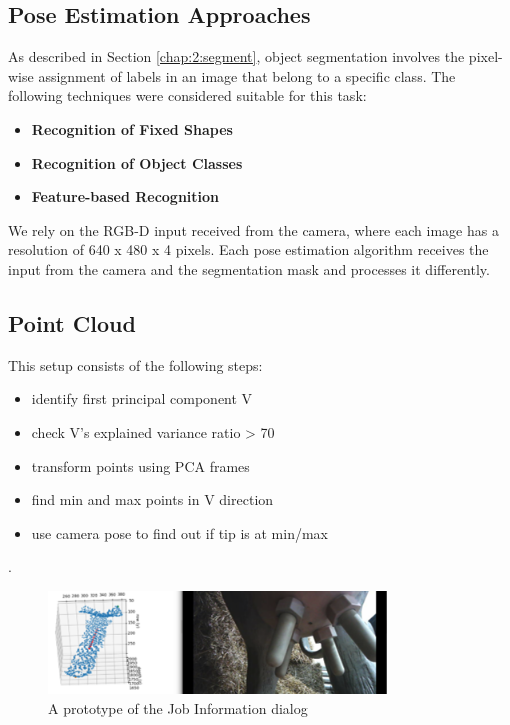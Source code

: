 
\subsection{Pose Estimation Approaches}
As described in Section \ref{chap:2:segment}, object segmentation involves the pixel-wise assignment of labels in an image that belong to a specific class. The following techniques were considered suitable for this task:
\begin{itemize}
    \item \textbf{Recognition of Fixed Shapes} 
    \item \textbf{Recognition of Object Classes} 
    \item \textbf{Feature-based Recognition} 
\end{itemize}
We rely on the RGB-D input received from the camera, where each image has a resolution of 640 x 480 x 4 pixels. Each pose estimation algorithm receives the input from the camera and the segmentation mask and processes it differently. 

    \subsection{Point Cloud}
    
    \lipsum[2-3]
    This setup consists of the following steps:
        \begin{itemize}
        \item identify first principal component V
        \item check V's explained variance ratio > 70%
        \item transform points using PCA frames
        \item find min and max points in V direction
        \item use camera pose to find out if tip is at min/max
        \end{itemize}.
    \begin{figure}[!ht]
        \centering
        \includegraphics[width=0.8\textwidth]{images/cow_pca.png}
        \caption{A prototype of the Job Information dialog}
        \label{fig:cow_fmc}
    \end{figure}
    
